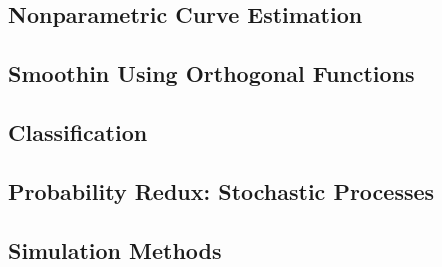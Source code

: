 \documentclass{article}
\begin{document}
\subsection{Nonparametric Curve Estimation}

\subsection{Smoothin Using Orthogonal Functions}

\subsection{Classification}

\subsection{Probability Redux: Stochastic Processes}

\subsection{Simulation Methods}
\end{document}
